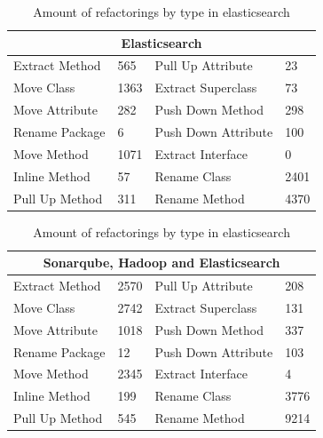 \begin{table}[h!]
\centering
\begin{tabular}{|l|l|l|l|}
\hline
\multicolumn{4}{|c|}{Elasticsearch} \\ \hline
Extract Method & 565 & Pull Up Attribute & 23 \\ \hline
Move Class & 1363 & Extract Superclass & 73 \\ \hline
Move Attribute & 282 & Push Down Method & 298 \\ \hline
Rename Package & 6 &  Push Down Attribute & 100 \\ \hline
Move Method & 1071 & Extract Interface & 0 \\ \hline
Inline Method & 57 & Rename Class & 2401 \\ \hline
Pull Up Method & 311 & Rename Method & 4370 \\ \hline
\end{tabular}
\caption{Amount of refactorings by type in elasticsearch}
\label{table:11}
\end{table}

\fi

\begin{table}[h!]
\centering
\begin{tabular}{|l|l|l|l|}
\hline
\multicolumn{4}{|c|}{Sonarqube, Hadoop and Elasticsearch} \\ \hline
Extract Method & 2570 & Pull Up Attribute & 208 \\ \hline
Move Class & 2742 & Extract Superclass & 131 \\ \hline
Move Attribute & 1018 & Push Down Method & 337 \\ \hline
Rename Package & 12 &  Push Down Attribute & 103 \\ \hline
Move Method & 2345 & Extract Interface & 4 \\ \hline
Inline Method & 199 & Rename Class & 3776 \\ \hline
Pull Up Method & 545 & Rename Method & 9214 \\ \hline
\end{tabular}
\caption{Amount of refactorings by type in elasticsearch}
\label{table:9}
\end{table}

